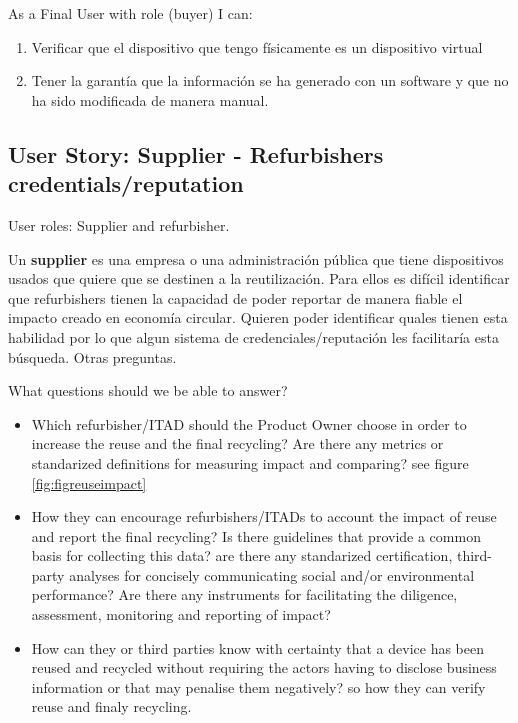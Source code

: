 \documentclass[
]{book}
\providecommand{\tightlist}{%
  \setlength{\itemsep}{0pt}\setlength{\parskip}{0pt}}
\begin{document}
As a Final User with role (buyer) I can:

\begin{enumerate}
\def\labelenumi{\arabic{enumi}.}
\item
  Verificar que el dispositivo que tengo físicamente es un dispositivo virtual
\item
  Tener la garantía que la información se ha generado con un software y que no ha sido modificada de manera manual.
\end{enumerate}

\hypertarget{user-story-supplier---refurbishers-credentialsreputation}{%
\subsection{User Story: Supplier - Refurbishers credentials/reputation}\label{user-story-supplier---refurbishers-credentialsreputation}}



User roles: Supplier and refurbisher.

Un \textbf{supplier} es una empresa o una administración pública que tiene dispositivos usados que quiere que se destinen a la reutilización. Para ellos es difícil identificar que refurbishers tienen la capacidad de poder reportar de manera fiable el impacto creado en economía circular. Quieren poder identificar quales tienen esta habilidad por lo que algun sistema de credenciales/reputación les facilitaría esta búsqueda. Otras preguntas.

What questions should we be able to answer?

\begin{itemize}
\tightlist
\item
  Which refurbisher/ITAD should the Product Owner choose in order to increase the reuse and the final recycling? Are there any metrics or standarized definitions for measuring impact and comparing? see figure \ref{fig:figreuseimpact}
\item
  How they can encourage refurbishers/ITADs to account the impact of reuse and report the final recycling? Is there guidelines that provide a common basis for collecting this data? are there any standarized certification, third-party analyses for concisely communicating social and/or environmental performance? Are there any instruments for facilitating the diligence, assessment, monitoring and reporting of impact?
\item
  How can they or third parties know with certainty that a device has been reused and recycled without requiring the actors having to disclose business information or that may penalise them negatively? so how they can verify reuse and finaly recycling.
\end{itemize}
\end{document}
